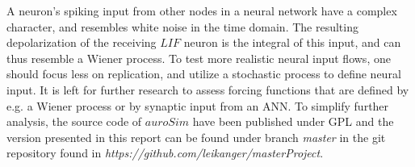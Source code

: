 	A neuron's spiking input from other nodes in a neural network have a complex character, and resembles white noise in the time domain.
	The resulting depolarization of the receiving $LIF$ neuron is the integral of this input, and can thus resemble a Wiener process.
	To test more realistic neural input flows, one should focus less on replication, and utilize a stochastic process to define neural input.
	It is left for further research to assess forcing functions that are defined by e.g. a Wiener process or by synaptic input from an ANN.
	To simplify further analysis, the source code of $auroSim$ have been published under GPL and the version presented in this report can be found under branch \emph{master} in the git repository found in \emph{https://github.com/leikanger/masterProject}\cite{gitRepoCommit}.
	
